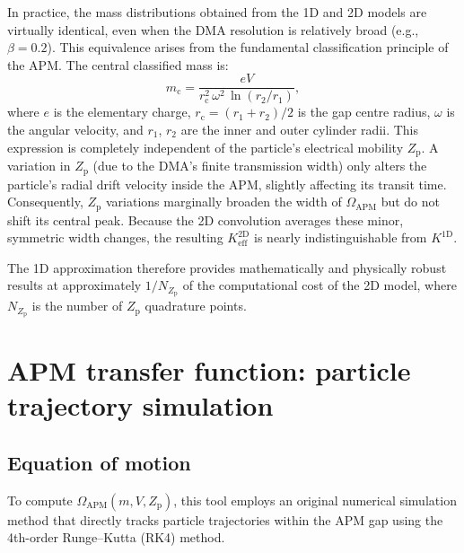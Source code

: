 \documentclass[11pt,a4paper]{article}
\begin{document}
In practice, the mass distributions obtained from the 1D and 2D models are
virtually identical, even when the DMA resolution is relatively broad
(e.g., $\beta = 0.2$).  This equivalence arises from the fundamental
classification principle of the APM.  The central classified mass is:
\begin{equation}
  m_{\mathrm{c}} =
    \frac{e V}
         {r_{\mathrm{c}}^{2} \, \omega^{2} \, \ln(r_{2}/r_{1})},
  \label{eq:central-mass}
\end{equation}
where $e$ is the elementary charge,
$r_{\mathrm{c}} = (r_{1} + r_{2})/2$ is the gap centre radius,
$\omega$ is the angular velocity, and $r_{1}$, $r_{2}$ are the inner and
outer cylinder radii.  This expression is completely independent of the
particle's electrical mobility $Z_{\mathrm{p}}$.  A variation in
$Z_{\mathrm{p}}$ (due to the DMA's finite transmission width) only alters the
particle's radial drift velocity inside the APM, slightly affecting its
transit time.  Consequently, $Z_{\mathrm{p}}$ variations marginally broaden
the width of $\Omega_{\mathrm{APM}}$ but do not shift its central peak.
Because the 2D convolution averages these minor, symmetric width changes, the
resulting $K_{\mathrm{eff}}^{\mathrm{2D}}$ is nearly indistinguishable from
$K^{\mathrm{1D}}$.

The 1D approximation therefore provides mathematically and physically robust
results at approximately $1/N_{Z_{\mathrm{p}}}$ of the computational cost of
the 2D model, where $N_{Z_{\mathrm{p}}}$ is the number of $Z_{\mathrm{p}}$
quadrature points.

\section{APM transfer function: particle trajectory simulation}
\label{sec:apm-transfer}

\subsection{Equation of motion}
\label{sec:equation-of-motion}

To compute $\Omega_{\mathrm{APM}}(m, V, Z_{\mathrm{p}})$, this tool employs
an original numerical simulation method that directly tracks particle
trajectories within the APM gap using the 4th-order Runge--Kutta (RK4) method.
\end{document}
